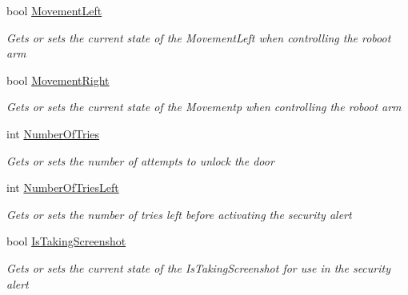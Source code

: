\begin{DoxyCompactItemize}
bool \hyperlink{class_microsoft_1_1_samples_1_1_kinect_1_1_kinect_security_system_1_1_gesture_result_view_a05936fd5b736c795bbef00ab58ea689f}{Movement\+Left}
\begin{DoxyCompactList}\small\item\em Gets or sets the current state of the \textquotesingle{}Movement\+Left\textquotesingle{} when controlling the roboot arm \end{DoxyCompactList}\item 
bool \hyperlink{class_microsoft_1_1_samples_1_1_kinect_1_1_kinect_security_system_1_1_gesture_result_view_a0a899a487b4b07ac527096028c4a21bc}{Movement\+Right}
\begin{DoxyCompactList}\small\item\em Gets or sets the current state of the \textquotesingle{}Movementp\textquotesingle{} when controlling the roboot arm \end{DoxyCompactList}\item 
int \hyperlink{class_microsoft_1_1_samples_1_1_kinect_1_1_kinect_security_system_1_1_gesture_result_view_aa8520f2014016ea6cf6f92656b99c5a1}{Number\+Of\+Tries}
\begin{DoxyCompactList}\small\item\em Gets or sets the number of attempts to unlock the door \end{DoxyCompactList}\item 
int \hyperlink{class_microsoft_1_1_samples_1_1_kinect_1_1_kinect_security_system_1_1_gesture_result_view_a00469709f2391265f2b3ac62231c2706}{Number\+Of\+Tries\+Left}
\begin{DoxyCompactList}\small\item\em Gets or sets the number of tries left before activating the security alert \end{DoxyCompactList}\item 
bool \hyperlink{class_microsoft_1_1_samples_1_1_kinect_1_1_kinect_security_system_1_1_gesture_result_view_a0185c5545335ffd07177daa82e8732c0}{Is\+Taking\+Screenshot}
\begin{DoxyCompactList}\small\item\em Gets or sets the current state of the \textquotesingle{}Is\+Taking\+Screenshot\textquotesingle{} for use in the security alert \end{DoxyCompactList}\item 

\end{DoxyCompactItemize}
